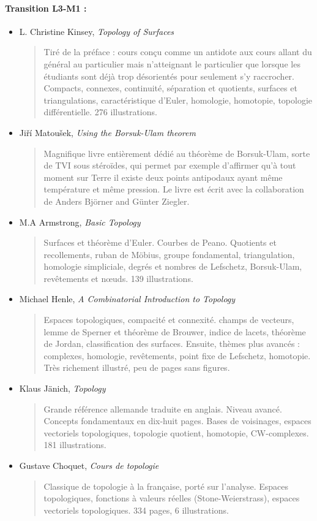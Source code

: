 \documentclass{article}
\begin{document}
\paragraph{Transition L3-M1 :}
\begin{itemize}

\item L. Christine Kinsey, \emph{Topology of Surfaces}
\begin{quote}
Tiré de la préface : \og cours conçu comme un antidote aux cours allant du général au particulier mais n'atteignant le particulier que lorsque les étudiants sont déjà trop désorientés pour seulement s'y raccrocher.\fg{} Compacts, connexes, continuité, séparation et quotients, surfaces et triangulations, caractéristique d'Euler, homologie, homotopie, topologie différentielle.  276 illustrations.
\end{quote}
\item Jiří Matoušek, \emph{Using the Borsuk-Ulam theorem}
\begin{quote}
Magnifique livre entièrement dédié au théorème de Borsuk-Ulam, sorte de TVI sous stéroïdes, qui permet par exemple d'affirmer qu'à tout moment sur Terre il existe deux points antipodaux ayant même température et même pression. Le livre est écrit avec la collaboration de Anders Björner and Günter Ziegler.
\end{quote}
\item M.A Armstrong, \emph{Basic Topology}
\begin{quote}
Surfaces et théorème d'Euler. Courbes de Peano. Quotients et recollements, ruban de Möbius, groupe fondamental, triangulation, homologie simpliciale, degrés et nombres de Lefschetz, Borsuk-Ulam, revêtements et n\oe uds. 139 illustrations. 
\end{quote}
\item Michael Henle, \emph{A Combinatorial Introduction to Topology}
\begin{quote}
Espaces topologiques, compacité et connexité. champs de vecteurs, lemme de Sperner et théorème de Brouwer, indice de lacets, théorème de Jordan, classification des surfaces. Ensuite, thèmes plus avancés : complexes, homologie, revêtements, point fixe de Lefschetz, homotopie. Très richement illustré, peu de pages sans figures.
\end{quote}
\item Klaus Jänich, \emph{Topology}
\begin{quote}
Grande référence allemande traduite en anglais.  Niveau avancé. \og Concepts fondamentaux\fg{} en dix-huit pages. Bases de voisinages, espaces vectoriels topologiques, topologie quotient, homotopie, CW-complexes. 181 illustrations.
\end{quote}
\item Gustave Choquet, \emph{Cours de topologie}
\begin{quote}
Classique de topologie à la française, porté sur l'analyse. Espaces topologiques, fonctions à valeurs réelles (Stone-Weierstrass), espaces vectoriels topologiques. 334 pages, 6 illustrations.
\end{quote}

\end{itemize}
\end{document}
